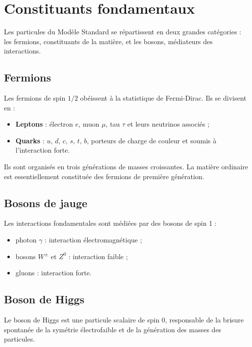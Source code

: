 \section{Constituants fondamentaux}

Les particules du Modèle Standard se répartissent en deux grandes catégories : les fermions, constituants de la matière, et les bosons, médiateurs des interactions.

\subsection{Fermions}

Les fermions de spin \(1/2\) obéissent à la statistique de Fermi-Dirac. Ils se divisent en :

\begin{itemize}
    \item \textbf{Leptons} : électron \(e\), muon \(\mu\), tau \(\tau\) et leurs neutrinos associés ;
    \item \textbf{Quarks} : \(u,\,d,\,c,\,s,\,t,\,b\), porteurs de charge de couleur et soumis à l'interaction forte.
\end{itemize}

Ils sont organisés en trois générations de masses croissantes. La matière ordinaire est essentiellement constituée des fermions de première génération.

\subsection{Bosons de jauge}

Les interactions fondamentales sont médiées par des bosons de spin 1 :

\begin{itemize}
    \item photon \(\gamma\) : interaction électromagnétique ;
    \item bosons \(W^\pm\) et \(Z^0\) : interaction faible \cite{pdg2024} ;
    \item gluons : interaction forte.
\end{itemize}

\subsection{Boson de Higgs}

Le boson de Higgs est une particule scalaire de spin 0, responsable de la brisure spontanée de la symétrie électrofaible et de la génération des masses des particules.

